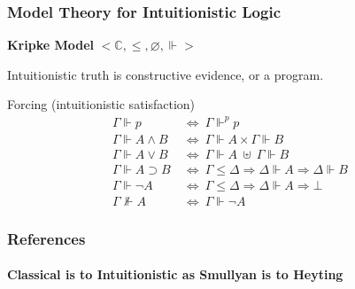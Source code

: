 \documentclass[mathserif]{beamer}
\def\imp{\supset}
\def\dfn{~\Leftrightarrow~}
\def\arr{\Rightarrow}
\newcommand{\force}[1]{\Gamma \Vdash #1}
\newcommand{\dforce}[1]{\Delta \Vdash #1}
\newcommand{\forcep}[1]{\Gamma \Vdash^p #1}
\newcommand{\nforce}[1]{\Gamma \nVdash #1}
\begin{document}
\begin{frame}
\frametitle{Model Theory for Intuitionistic Logic}

{\bf Kripke Model} $< \mathbb{C} , \leq , \varnothing , \Vdash >$

Intuitionistic truth is constructive evidence, or a program.


\begin{block}{Forcing (intuitionistic satisfaction)}
\begin{align*}
\force{p} &\dfn \forcep{p}\\
\force{A \land B} &\dfn \force{A} \times \force{B}\\
\force{A \lor B} &\dfn \force{A} ~\uplus~ \force{B}\\
\force{A \imp B} &\dfn \Gamma \leq \Delta \arr \dforce{A} \arr \dforce{B}\\
\force{\neg A} &\dfn \Gamma \leq \Delta \arr \dforce{A} \arr \bot\\
\nforce{A} &\dfn \force{\neg A}
\end{align*}
\end{block}

\end{frame}


\begin{frame}
\frametitle{References}
\framesubtitle{Classical is to Intuitionistic as Smullyan is to Heyting}

\end{frame}
\end{document}
